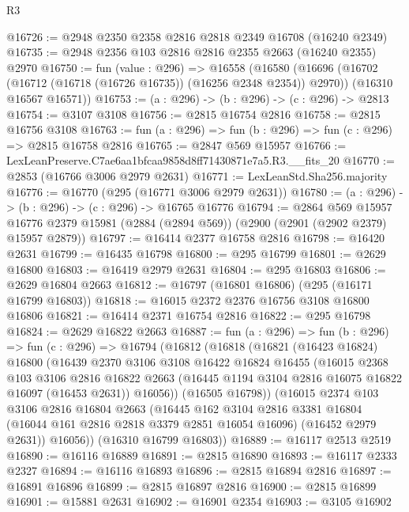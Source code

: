 \begin{lexlean}{R3}
\begin{coremodule}
@16726 := @2948 @2350 @2358 @2816 @2818 @2349 @16708 (@16240 @2349)
@16735 := @2948 @2356 @103 @2816 @2816 @2355 @2663 (@16240 @2355) @2970
@16750 := fun (value : @296) =>
  @16558
    (@16580
      (@16696 (@16702 (@16712 (@16718 (@16726 @16735)) (@16256 @2348 @2354)) @2970))
      (@16310 @16567 @16571))
@16753 := (a : @296) -> (b : @296) -> (c : @296) -> @2813
@16754 := @3107 @3108
@16756 := @2815 @16754 @2816
@16758 := @2815 @16756 @3108
@16763 := fun (a : @296) => fun (b : @296) => fun (c : @296) => @2815 @16758 @2816
@16765 := @2847 @569 @15957
@16766 := LexLeanPreserve.C7ae6aa1bfcaa9858d8ff71430871e7a5.R3.__fits_20
@16770 := @2853 (@16766 @3006 @2979 @2631)
@16771 := LexLeanStd.Sha256.majority
@16776 := @16770 (@295 (@16771 @3006 @2979 @2631))
@16780 := (a : @296) -> (b : @296) -> (c : @296) -> @16765 @16776
@16794 := @2864
    @569
    @15957
    @16776
    @2379
    @15981
    (@2884 (@2894 @569))
    (@2900 (@2901 (@2902 @2379) @15957 @2879))
@16797 := @16414 @2377 @16758 @2816
@16798 := @16420 @2631
@16799 := @16435 @16798
@16800 := @295 @16799
@16801 := @2629 @16800
@16803 := @16419 @2979 @2631
@16804 := @295 @16803
@16806 := @2629 @16804 @2663
@16812 := @16797 (@16801 @16806) (@295 (@16171 @16799 @16803))
@16818 := @16015 @2372 @2376 @16756 @3108 @16800 @16806
@16821 := @16414 @2371 @16754 @2816
@16822 := @295 @16798
@16824 := @2629 @16822 @2663
@16887 := fun (a : @296) =>
  fun (b : @296) =>
  fun (c : @296) =>
  @16794
    (@16812
      (@16818
        (@16821
          (@16423 @16824)
          @16800
          (@16439
            @2370
            @3106
            @3108
            @16422
            @16824
            @16455
            (@16015
              @2368
              @103
              @3106
              @2816
              @16822
              @2663
              (@16445 @1194 @3104 @2816 @16075 @16822 @16097 (@16453 @2631))
              @16056))
          (@16505 @16798))
        (@16015
          @2374
          @103
          @3106
          @2816
          @16804
          @2663
          (@16445
            @162
            @3104
            @2816
            @3381
            @16804
            (@16044 @161 @2816 @2818 @3379 @2851 @16054 @16096)
            (@16452 @2979 @2631))
          @16056))
      (@16310 @16799 @16803))
@16889 := @16117 @2513 @2519
@16890 := @16116 @16889
@16891 := @2815 @16890
@16893 := @16117 @2333 @2327
@16894 := @16116 @16893
@16896 := @2815 @16894 @2816
@16897 := @16891 @16896
@16899 := @2815 @16897 @2816
@16900 := @2815 @16899
@16901 := @15881 @2631
@16902 := @16901 @2354
@16903 := @3105 @16902

\end{coremodule}
\end{lexlean}

